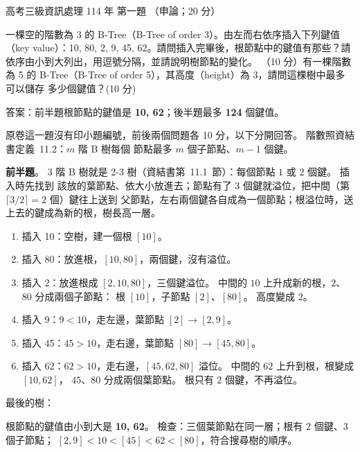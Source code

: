 \begin{pastexam}[label={px:gk3-114-ds-01}]{高考三級資訊處理 114 年 第一題}
（申論；20 分）

一棵空的階數為 3 的 B-Tree（B-Tree of order 3）。由左而右依序插入下列鍵值（key value）：10, 80, 2, 9, 45,
62。請問插入完畢後，根節點中的鍵值有那些？請依序由小到大列出，用逗號分隔，並請說明樹節點的變化。
（10 分）有一棵階數為 5 的 B-Tree（B-Tree of order 5），其高度（height）為 3，請問這棵樹中最多可以儲存
多少個鍵值？(10 分)
\end{pastexam}

\begin{pastsoln}
答案：前半題根節點的鍵值是 \textbf{10, 62}；後半題最多 \textbf{124} 個鍵值。

原卷這一題沒有印小題編號，前後兩個問題各 10 分，以下分開回答。 階數照資結書定義~11.2：$m$ 階 B 樹每個
節點最多 $m$ 個子節點、$m - 1$ 個鍵。

\textbf{前半題}。 $3$ 階 B 樹就是 2-3 樹（資結書第~11.1~節）：每個節點 $1$ 或 $2$ 個鍵。 插入時先找到
該放的葉節點、依大小放進去；節點有了 $3$ 個鍵就溢位，把中間（第 $\lceil 3/2 \rceil = 2$ 個）鍵往上送到
父節點，左右兩個鍵各自成為一個節點；根溢位時，送上去的鍵成為新的根，樹長高一層。
\begin{enumerate}[label=(\arabic*)]
\item 插入 10：空樹，建一個根 $[10]$。
\item 插入 80：放進根，$[10, 80]$，兩個鍵，沒有溢位。
\item 插入 2：放進根成 $[2, 10, 80]$，三個鍵溢位。 中間的 $10$ 上升成新的根，$2$、$80$ 分成兩個子節點：
根 $[10]$，子節點 $[2]$、$[80]$。 高度變成 $2$。
\item 插入 9：$9 < 10$，走左邊，葉節點 $[2] \to [2, 9]$。
\item 插入 45：$45 > 10$，走右邊，葉節點 $[80] \to [45, 80]$。
\item 插入 62：$62 > 10$，走右邊，$[45, 62, 80]$ 溢位。 中間的 $62$ 上升到根，根變成 $[10, 62]$，
$45$、$80$ 分成兩個葉節點。 根只有 $2$ 個鍵，不再溢位。
\end{enumerate}
最後的樹：
\begin{center}
\end{center}
根節點的鍵值由小到大是 \textbf{10, 62}。 檢查：三個葉節點在同一層；根有 $2$ 個鍵、$3$ 個子節點；
$[2, 9] < 10 < [45] < 62 < [80]$，符合搜尋樹的順序。


\end{pastsoln}
